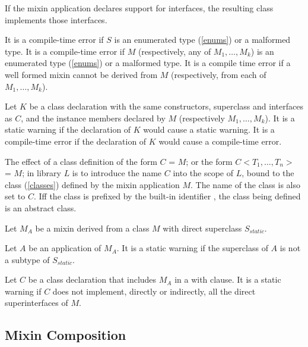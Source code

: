\documentclass{article}
\newcommand{\code}[1]{{\sf #1}}
\begin{document}

\LMHash{}
If the mixin application declares support for interfaces, the resulting class implements those interfaces.

\LMHash{}
It is a compile-time error if $S$ is an enumerated type (\ref{enums}) or a malformed type. It is a compile-time error if $M$ (respectively, any of $M_1, \ldots, M_k$) is an enumerated type (\ref{enums}) or a malformed type. It is a compile time error if a well formed mixin cannot be derived from $M$ (respectively, from each of $M_1, \ldots, M_k$). 

\LMHash{}
Let $K$ be a class declaration  with the same constructors, superclass and interfaces as $C$,  and the instance members declared by $M$ (respectively $M_1, \ldots, M_k$). It is a static warning if the declaration of $K$ would cause a static warning.  It is a compile-time error if the declaration of $K$ would cause a compile-time error.


\LMHash{}
The effect of a class definition of the form \code{\CLASS{} $C$ = $M$; } or the form 
 \code{\CLASS{} $C<T_1, \ldots, T_n>$ = $M$; } in library $L$  is to introduce the name $C$ into the scope of $L$, bound to the class (\ref{classes}) defined by the mixin application $M$. The name of the class is also set to $C$. Iff the  class is prefixed by the built-in identifier \ABSTRACT{}, the class being defined is an abstract class.
 
 Let $M_A$ be a mixin derived from a class $M$ with direct superclass $S_{static}$.

Let $A$ be an application of $M_A$. It is a static warning if the superclass of $A$ is not a subtype of $S_{static}$.

Let $C$ be a class declaration that includes $M_A$ in a with clause. It is a static warning if $C$ does not implement, directly or indirectly, all the direct superinterfaces of $M$.
 

\subsection{Mixin Composition}
\end{document}
